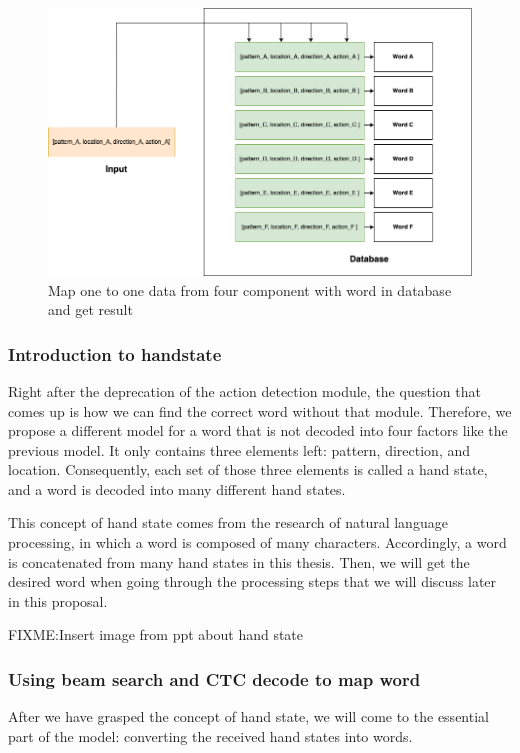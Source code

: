 \begin{figure}[H]
	\centering
	\includegraphics[width=\textwidth]{img/Chap4/MapWord.png}
	\caption{Map one to one data from four component with word in database and get result}
	\label{fig:Chap4-MapWord}
\end{figure}

\subsubsection{ Introduction to handstate }

Right after the deprecation of the action detection module, the question that comes up is how we can find the correct word without that module. Therefore, we propose a different model for a word that is not decoded into four factors like the previous model. It only contains three elements left: pattern, direction, and location. Consequently, each set of those three elements is called a hand state, and a word is decoded into many different hand states.

This concept of hand state comes from the research of natural language processing, in which a word is composed of many characters. Accordingly, a word is concatenated from many hand states in this thesis. Then, we will get the desired word when going through the processing steps that we will discuss later in this proposal.

FIXME:Insert image from ppt about hand state

\subsubsection{ Using beam search and CTC decode to map word}

After we have grasped the concept of hand state, we will come to the essential part of the model: converting the received hand states into words.
      
